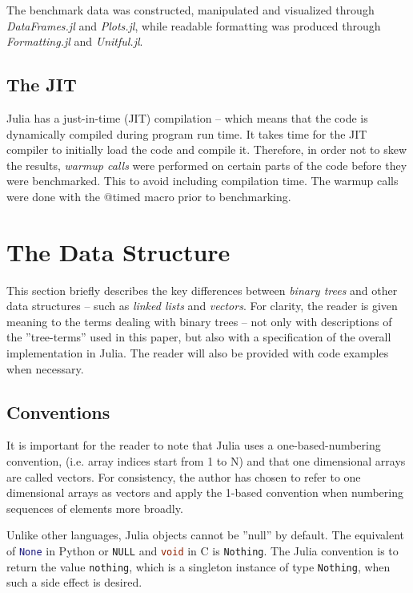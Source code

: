 \documentclass[a4paper, 11pt]{article}
\begin{document}
    The benchmark data was constructed, manipulated and visualized through
    \emph{DataFrames.jl} and \emph{Plots.jl}, while 
    readable formatting was produced through \emph{Formatting.jl} and \emph{Unitful.jl}. 

    \subsection*{The JIT}
    Julia has a just-in-time (JIT) compilation -- which means that the code is
    dynamically compiled during program run time.     
    It takes time for the JIT compiler to 
    initially load the code and compile it. Therefore, in order not to skew the
    results, \emph{warmup calls} were performed on certain parts of the code
    before they were benchmarked. This to avoid including 
    compilation time. The warmup calls were done with the @timed macro prior to
    benchmarking.

    \section*{The Data Structure}
    This section briefly describes the key differences between \emph{binary trees} 
    and other data structures -- such as \emph{linked lists} and \emph{vectors}.
    For clarity, the reader is given meaning to the terms dealing 
    with binary trees -- not only with descriptions of the
    ''tree-terms'' used in this paper, but also with a specification 
    of the overall implementation in Julia. The reader will also be provided with 
    code examples when necessary.

    \subsection*{Conventions}
    It is important for the reader to note that Julia uses a one-based-numbering
    convention, (i.e. array indices start from 1 to N) and that one dimensional
    arrays are called vectors. 
    For consistency, the author has chosen to refer to one dimensional
    arrays as vectors and apply the 1-based convention when numbering
    sequences of elements more broadly. 
    
    Unlike other languages, Julia objects cannot be ''null'' by default. The
    equivalent of \lstinline[language=Python]{None} in Python or
    \lstinline[language=C]{NULL} and \lstinline[language=C]{void} in C is
    \texttt{Nothing}. The Julia convention is to return the value
    \texttt{nothing}, which is a singleton instance of type
    \texttt{Nothing}, when such a side effect is
    desired. 
\end{document}

